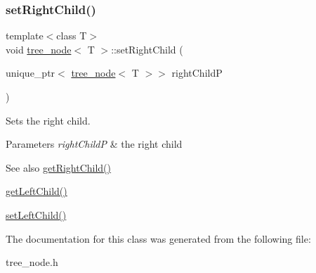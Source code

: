 \subsubsection{\texorpdfstring{set\+Right\+Child()}{setRightChild()}}
{\footnotesize\ttfamily template$<$class T$>$ \\
void \hyperlink{classtree__node}{tree\+\_\+node}$<$ T $>$\+::set\+Right\+Child (\begin{DoxyParamCaption}\item[{unique\+\_\+ptr$<$ \hyperlink{classtree__node}{tree\+\_\+node}$<$ T $>$$>$}]{right\+ChildP }\end{DoxyParamCaption})\hspace{0.3cm}{\ttfamily [inline]}}

Sets the right child. 
\begin{DoxyParams}{Parameters}
{\em right\+ChildP} & the right child \\
\hline
\end{DoxyParams}
\begin{DoxySeeAlso}{See also}
\hyperlink{classtree__node_a5e584d47f2c11941fe0406836fe50159}{get\+Right\+Child()} 

\hyperlink{classtree__node_ae161b70a3780e0cb3ecd4b57acc9e2d1}{get\+Left\+Child()} 

\hyperlink{classtree__node_a3db979969a0fe8505ba65c7afabb5463}{set\+Left\+Child()} 
\end{DoxySeeAlso}


The documentation for this class was generated from the following file\+:\begin{DoxyCompactItemize}
\item 
tree\+\_\+node.\+h\end{DoxyCompactItemize}
